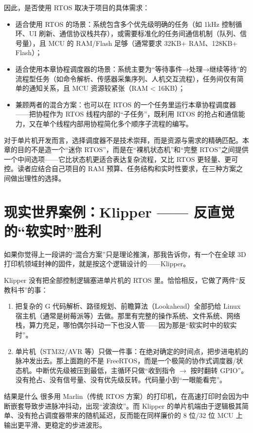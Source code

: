 因此，是否使用 RTOS 取决于项目的具体需求：

\begin{itemize}
	\item 适合使用 RTOS 的场景：系统包含多个优先级明确的任务（如 1kHz 控制循环、UI 刷新、通信协议栈共存），或需要标准化的任务间通信机制（队列、信号量），且 MCU 的 RAM/Flash 足够（通常要求 32KB+ RAM、128KB+ Flash）；
	\item 适合使用本章协程调度器的场景：系统主要为“等待事件→处理→继续等待”的流程型任务（如命令解析、传感器采集序列、人机交互流程），任务间仅有简单的通知关系，且 MCU 资源较紧张（RAM < 16KB）；
	\item 兼顾两者的混合方案：也可以在 RTOS 的一个任务里运行本章协程调度器——把协程作为 RTOS 线程内部的“子任务”，既利用 RTOS 的抢占和通信能力，又在单个线程内部用协程简化多个顺序子流程的编写。
\end{itemize}

对于单片机开发而言，选择调度器不是技术崇拜，而是资源与需求的精确匹配。本章的目的不是造一个“迷你 RTOS”，而是在“裸机状态机”和“完整 RTOS”之间提供一个中间选项——它比状态机更适合表达复杂流程，又比 RTOS 更轻量、更可控。读者应结合自己项目的 RAM 预算、任务结构和实时性要求，在三种方案之间做出理性的选择。

\section{现实世界案例：Klipper —— 反直觉的“软实时”胜利}

如果你觉得上一段讲的“混合方案”只是理论推演，那我告诉你，有一个在全球 3D 打印机领域封神的固件，就是按这个逻辑设计的——Klipper。

Klipper 没有把全部控制逻辑塞进单片机的 RTOS 里。恰恰相反，它做了两件“反教科书”的事：

\begin{enumerate}
\item 把复杂的 G 代码解析、路径规划、前瞻算法（Lookahead）全部扔给 Linux 宿主机（通常是树莓派等）去做。那里有完整的操作系统、文件系统、网络栈，算力充足，哪怕偶尔抖动一下也没人管——因为那是“软实时中的软实时”。
\item 单片机（STM32/AVR 等）只做一件事：在绝对确定的时间点，把步进电机的脉冲发出去。那上面跑的不是 FreeRTOS，而是一个极简的协作式调度器/状态机。中断优先级被压到最低，主循环只做“收到指令 $\to$ 按时翻转 GPIO”。没有抢占、没有信号量、没有优先级反转。代码量小到“一眼能看完”。
\end{enumerate}

\begin{anybox}{结果是什么}
很多用 Marlin（传统 RTOS 方案）的打印机，在高速打印时会因为中断嵌套导致步进脉冲抖动，出现“波浪纹”。而 Klipper 的单片机端由于逻辑极其简单、没有抢占调度器带来的随机延迟，反而能在同样廉价的 8 位/32 位 MCU 上输出更平滑、更稳定的步进波形。
\end{anybox}

